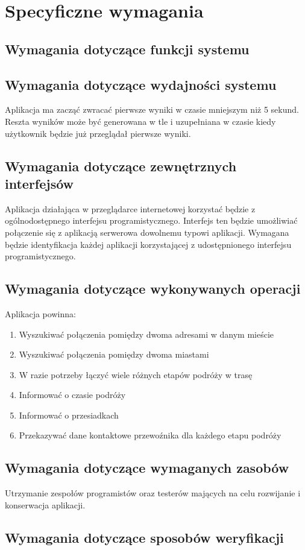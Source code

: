 \documentclass[12pt,a4paper]{report}
\begin{document}
\section{Specyficzne wymagania}
\subsection{Wymagania dotyczące funkcji systemu}
\subsection{Wymagania dotyczące wydajności systemu}
	Aplikacja ma zacząć zwracać pierwsze wyniki w czasie mniejszym niż 5 sekund. Reszta wyników może być generowana w tle i uzupełniana w czasie kiedy użytkownik będzie już przeglądał pierwsze wyniki.
\subsection{Wymagania dotyczące zewnętrznych interfejsów}
Aplikacja działająca w przeglądarce internetowej korzystać będzie z ogólnodostępnego interfejsu programistycznego. Interfejs ten będzie umożliwiać połączenie się z aplikacją serwerowa dowolnemu typowi aplikacji. Wymagana będzie identyfikacja każdej aplikacji korzystającej z udostępnionego interfejsu programistycznego.
\subsection{Wymagania dotyczące wykonywanych operacji}
	Aplikacja powinna:
	\begin{enumerate}	
		\item Wyszukiwać połączenia pomiędzy dwoma adresami w danym mieście
		\item Wyszukiwać połączenia pomiędzy dwoma miastami
		\item W razie potrzeby łączyć wiele różnych etapów podróży w trasę
		\item Informować o czasie podróży
		\item Informować o przesiadkach
		\item Przekazywać dane kontaktowe przewoźnika dla każdego etapu podróży 
	\end{enumerate}
\subsection{Wymagania dotyczące wymaganych zasobów}
	Utrzymanie zespołów programistów oraz testerów mających na celu rozwijanie i konserwacja aplikacji.
\subsection{Wymagania dotyczące sposobów weryfikacji}
\end{document}
